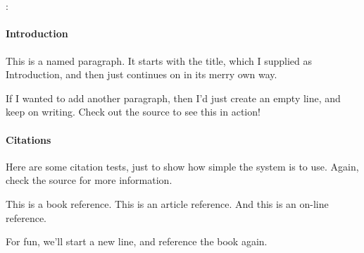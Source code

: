 \documentclass[12pt,oneside]{article}
\begin{document}


\begin{center}
{\large\bf \projectTitle \\ ~\\}
{\teamName: \\\teamMembers}
\end{center}

\doublespace

\paragraph{Introduction}
This is a named paragraph. It starts with the title, which I supplied as
Introduction, and then just continues on in its merry own way.

If I wanted to add another paragraph, then I'd just create an empty line,
and keep on writing. Check out the source to see this in action!

\paragraph{Citations}
Here are some citation tests, just to show how simple the system is to use. 
Again, check the source for more information.

This is a book\cite{book99} reference. This is an article\cite{journal99}
reference. And this is an on-line\cite{website:github-ndts} reference.

For fun, we'll start a new line, and reference the book\cite{book99} again.

\singlespace


\end{document}
